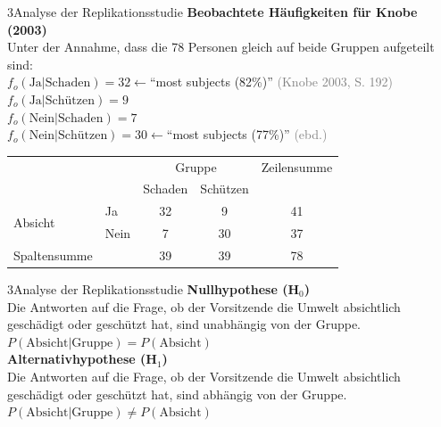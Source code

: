 \documentclass[xcolor=table,9pt,aspectratio=169]{beamer}
\begin{document}
\begin{frame}{\vspace*{10mm}3\hspace*{1em}Analyse der Replikationsstudie}
\textbf{Beobachtete Häufigkeiten für Knobe (2003)}\\
\smallskip
Unter der Annahme, dass die 78 Personen gleich auf beide Gruppen aufgeteilt sind:\\
\smallskip
$f_{o}(\text{Ja}|\text{Schaden})=32$\hspace{1em}$\leftarrow$\enquote{most subjects (82\%)} \textcolor{gray}{(Knobe 2003, S. 192)}\\
$f_{o}(\text{Ja}|\text{Schützen})=9$\\
$f_{o}(\text{Nein}|\text{Schaden})=7$\\
$f_{o}(\text{Nein}|\text{Schützen})=30$\hspace{1em}$\leftarrow$\enquote{most subjects (77\%)} \textcolor{gray}{(ebd.)}\\

\bigskip
\begin{tabular}{llccc}
   \arrayrulecolor{blue2}\hline
                              &        & \multicolumn{2}{c}{Gruppe}   & Zeilensumme   \\
                              &        & Schaden   & Schützen         &               \\
   \hline
   \multirow{2}{*}{Absicht}   & Ja     & 32        &  9               & 41            \\
                              & Nein   &  7        & 30               & 37            \\
   \hline
   Spaltensumme               &        & 39        & 39               & 78            \\
   \hline
\end{tabular}
\end{frame}


\begin{frame}{\vspace*{10mm}3\hspace*{1em}Analyse der Replikationsstudie}
\textbf{Nullhypothese (H$_{0}$)}\\
\smallskip
Die Antworten auf die Frage, ob der Vorsitzende die Umwelt absichtlich geschädigt oder geschützt hat, sind unabhängig von der Gruppe.\\
\smallskip
$P(\text{Absicht}|\text{Gruppe})=P(\text{Absicht})$\\

\bigskip
\textbf{Alternativhypothese (H$_{1}$)}\\
\smallskip
Die Antworten auf die Frage, ob der Vorsitzende die Umwelt absichtlich geschädigt oder geschützt hat, sind abhängig von der Gruppe.\\
\smallskip
$P(\text{Absicht}|\text{Gruppe})\neq P(\text{Absicht})$\\
\end{frame}
\end{document}

